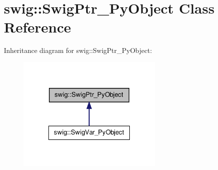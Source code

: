 \hypertarget{classswig_1_1_swig_ptr___py_object}{\section{swig\-:\-:Swig\-Ptr\-\_\-\-Py\-Object Class Reference}
\label{classswig_1_1_swig_ptr___py_object}
}


Inheritance diagram for swig\-:\-:Swig\-Ptr\-\_\-\-Py\-Object\-:\nopagebreak
\begin{figure}[H]
\begin{center}
\leavevmode
\includegraphics[width=204pt]{classswig_1_1_swig_ptr___py_object__inherit__graph}
\end{center}
\end{figure}
